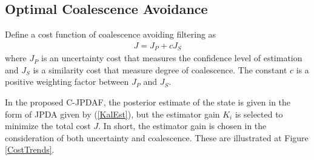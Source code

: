 \documentclass[letterpaper, 10pt, conference]{ieeeconf}
\begin{document}
\subsection{Optimal Coalescence Avoidance}

Define a cost function of coalescence avoiding filtering as
\begin{align}
J=J_P+cJ_S
\end{align}
where $J_P$ is an uncertainty cost that measures the confidence level of estimation and $J_S$ is a similarity cost that measure degree of coalescence. The constant $c$ is a positive weighting factor between $J_P$ and $J_S$. 

In the proposed C-JPDAF, the posterior estimate of the state is given in the form of JPDA given by (\ref{KalEst}), but the estimator gain $K_i$ is selected to minimize the total cost $J$. In short, the estimator gain is chosen in the consideration of both uncertainty and coalescence. These are illustrated at Figure \ref{CostTrends}.





\end{document}
